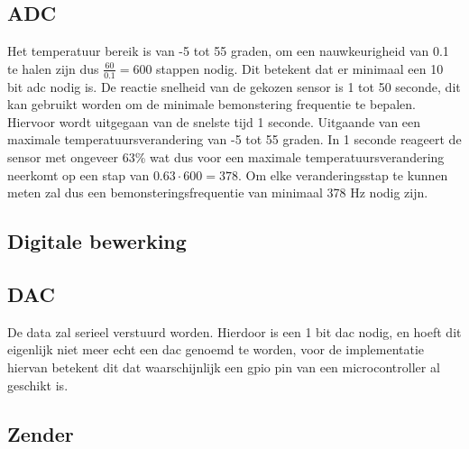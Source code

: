 \newpage
\subsection{ADC} %
Het temperatuur bereik is van -5 tot 55 graden, om een nauwkeurigheid van 0.1 te halen zijn dus $\frac{60}{0.1}= 600$ stappen nodig. Dit betekent dat er minimaal een 10 bit adc nodig is. De reactie snelheid van de gekozen sensor is 1 tot 50 seconde, dit kan gebruikt worden om de minimale bemonstering frequentie te bepalen. Hiervoor wordt uitgegaan van de snelste tijd 1 seconde. Uitgaande van een maximale temperatuursverandering van -5 tot 55 graden. In 1 seconde reageert de sensor met ongeveer 63\% wat dus voor een maximale temperatuursverandering neerkomt op een stap van $0.63\cdot600 = 378$. Om elke veranderingsstap te kunnen meten zal dus een bemonsteringsfrequentie van minimaal 378 Hz nodig zijn.

\subsection{Digitale bewerking}


\subsection{DAC}
De data zal serieel verstuurd worden. Hierdoor is een 1 bit dac nodig, en hoeft dit eigenlijk niet meer echt een dac genoemd te worden, voor de implementatie hiervan betekent dit dat waarschijnlijk een gpio pin van een microcontroller al geschikt is.
\subsection{Zender}